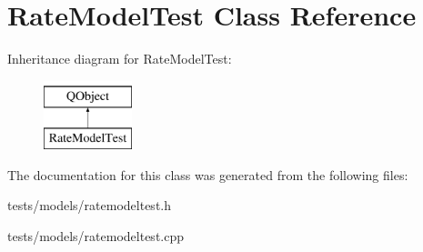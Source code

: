 \hypertarget{classRateModelTest}{}\section{Rate\+Model\+Test Class Reference}
\label{classRateModelTest}
Inheritance diagram for Rate\+Model\+Test\+:\begin{figure}[H]
\begin{center}
\leavevmode
\includegraphics[height=2.000000cm]{d2/dcd/classRateModelTest}
\end{center}
\end{figure}


The documentation for this class was generated from the following files\+:\begin{DoxyCompactItemize}
\item 
tests/models/ratemodeltest.\+h\item 
tests/models/ratemodeltest.\+cpp\end{DoxyCompactItemize}
